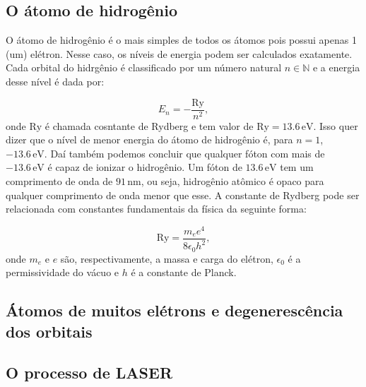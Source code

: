\documentclass{article}
\begin{document}
\subsection{O \'atomo de hidrog\^enio}

O \'atomo de hidrog\^enio \'e o mais simples de todos os \'atomos pois possui apenas 1 (um) el\'etron. Nesse caso, os n\'iveis de energia podem ser calculados exatamente. Cada orbital do hidrg\^enio \'e classificado por um n\'umero natural $n\in \mathbb{N}$ e a energia desse n\'ivel \'e dada por:

\begin{equation}
E_n = -\frac{\text{Ry}}{n^2},
\end{equation}
onde $\text{Ry}$ \'e chamada cosntante de Rydberg e tem valor de $\text{Ry}=13.6\,\text{eV}$. Isso quer dizer que o n\'ivel de menor energia do \'atomo de hidrog\^enio \'e, para $n=1$, $-13.6\,\text{eV}$. Da\'i tamb\'em podemos concluir que qualquer f\'oton com mais de $-13.6\,\text{eV}$ \'e capaz de ionizar o hidrog\^enio. Um f\'oton de $13.6\,\text{eV}$ tem um comprimento de onda de $91\,\text{nm}$, ou seja, hidrog\^enio at\^omico \'e opaco para qualquer comprimento de onda menor que esse. A constante de Rydberg pode ser relacionada com constantes fundamentais da f\'isica da seguinte forma:

\begin{equation}
\text{Ry} = \frac{m_ee^4}{8\epsilon_0h^2},
\end{equation}
onde $m_e$ e $e$ s\~ao, respectivamente, a massa e carga do el\'etron, $\epsilon_0$ \'e a permissividade do v\'acuo e $h$ \'e a constante de Planck.

\subsection{\'Atomos de muitos el\'etrons e degeneresc\^encia dos orbitais}
\subsection{O processo de LASER}
\end{document}
